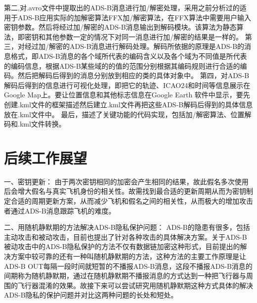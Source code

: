 第二,对.avro文件中提取出的ADS-B消息进行加/解密处理，采用之前分析过的适用于ADS-B应用实际的加解密算法FFX加/解密算法，在FFX算法中需要用户输入密钥参数。然后将经过加/解密的ADS-B消息输出到解码模块。该算法为静态算法，即密钥和其他参数一定的情况下对同一消息进行加/解密的结果是一样的。\newline
第三，对经过加/解密的ADS-B消息进行解码处理。解码所依据的原理是ADS-B的消息格式，即ADS-B消息的各个域所代表的编码含义以及各个域为不同值是所代表的编码信息，根据ADS-B某些域的的值的范围分别根据其编码规则进行合适的编码。然后把解码后得到的消息分别放到相应的类的具体对象中。\newline
第四，对ADS-B解码后得到的信息进行可视化处理，即把它的轨迹、ICAO24和时间等信息展示在Google Map上。要让位置信息和其他标志信息在Google Earth 软件中显示，要先创建.kml文件的框架描述然后建立.kml文件再把这些ADS-B解码后得到的具体信息放在.kml文件中。
最后，描述了关键功能的代码实现，包括加/解密算法、位置解码和.kml文件转换。

\section{后续工作展望}
一、密钥更新：\newline
由于两次密钥相同的加密会产生相同的结果，故此假名多次使用后会增大假名与真实飞机身份的相关性。故需找到最合适的更新周期从而为密钥制定合适的周期更新方案，从而减少飞机和假名之间的相关性，从而极大的增加攻击者通过ADS-B消息跟踪飞机的难度。

二、用随机静默期的方法解决ADS-B隐私保护问题：\newline
ADS-B的隐患有很多，包括主动攻击和被动攻击，目前也提出了针对各种攻击的具体解决方案。关于ADS-B被动攻击中的ADS-B隐私保护的方法不仅有数据链加密这种形式，目前提出的解决方案中较可靠的还有一种叫随机静默期的方法，这种方法的主要工作原理是让ADS-B OUT每隔一段时间就短暂的不播报ADS-B消息，这段不播报ADS-B消息的间期称为随机静默期，通过在随机静默期不播报消息的方式达到一种把飞行器与周围的飞行器混淆的效果。故接下来可以尝试研究用随机静默期这种方式具体的解决ADS-B隐私的保护问题并对比这两种问题的长处和短处。
